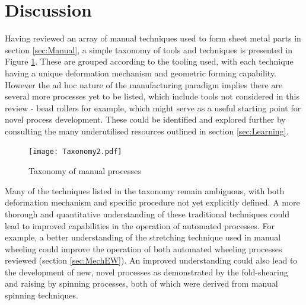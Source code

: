 



\section{Discussion}\label{sec:discussion}

Having reviewed an array of manual techniques used to form sheet metal parts in section \ref{sec:Manual}, a simple taxonomy of tools and techniques is presented in Figure \ref{fig:ManualTaxonomy}. These are grouped according to the tooling used, with each technique having a unique deformation mechanism and geometric forming capability. However the ad hoc nature of the manufacturing paradigm implies there are several more processes yet to be listed, which include tools not considered in this review - bead rollers for example, which might serve as a useful starting point for novel process development. These could be identified and explored further by consulting the many underutilised resources outlined in section \ref{sec:Learning}.

\begin{figure}[h]
	\centering
    \texttt{[image: Taxonomy2.pdf]}
    \caption{Taxonomy of manual processes}
    \label{fig:ManualTaxonomy}
\end{figure}

Many of the techniques listed in the taxonomy remain ambiguous, with both deformation mechanism and specific procedure not yet explicitly defined. A more thorough and quantitative understanding of these traditional techniques could lead to improved capabilities in the operation of automated processes. For example, a better understanding of the stretching technique used in manual wheeling could improve the operation of both automated wheeling processes reviewed (section \ref{sec:MechEW}). An improved understanding could also lead to the development of new, novel processes as demonstrated by the fold-shearing \citep{Allwood2019Folding-shearing:Change} and raising by spinning \citep{Russo2020RaisingSpinning} processes, both of which were derived from manual spinning techniques.


